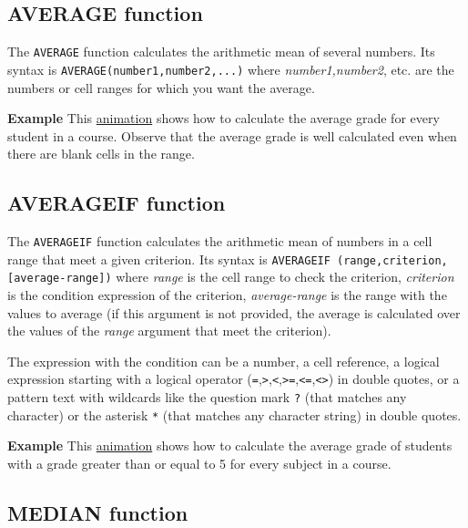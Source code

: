 \subsection{AVERAGE function}\hypertarget{average-function}{}\label{average-function}

The \texttt{AVERAGE} function calculates the arithmetic mean of several numbers. Its syntax is \texttt{AVERAGE(number1,number2,...)} where \emph{number1,number2}, etc. are the numbers or cell ranges for which you want the average.

\textbf{Example} This \href{http://aprendeconalf.es/office/excel/manual/img/example_function_average.gif}{animation} shows how to calculate the average grade for every student in a course. Observe that the average grade is well calculated even when there are blank cells in the range.

\subsection{AVERAGEIF function}\hypertarget{averageif-function}{}\label{averageif-function}

The \texttt{AVERAGEIF} function calculates the arithmetic mean of numbers in a cell range that meet a given criterion. Its syntax is \texttt{AVERAGEIF	(range,criterion,[average-range])} where \emph{range} is the cell range to check the criterion, \emph{criterion} is the condition expression of the criterion, \emph{average-range} is the range with the values to average (if this argument is not provided, the average is calculated over the values of the \emph{range} argument that meet the criterion).

The expression with the condition can be a number, a cell reference, a logical expression starting with a logical
operator
(\texttt{=},\texttt{\textgreater{}},\texttt{\textless{}},\texttt{\textgreater{}=},\texttt{\textless{}=},\texttt{\textless{}\textgreater{}})
in double quotes, or a pattern text with wildcards like the question mark \texttt{?} (that matches any character)
or the asterisk \texttt{*} (that matches any character string) in double quotes.

\textbf{Example} This \href{http://aprendeconalf.es/office/excel/manual/img/example_function_averageif.gif}{animation} shows how to calculate the average grade of students with a grade greater than or equal to 5 for every subject in a course.

\subsection{MEDIAN function}\hypertarget{median-function}{}\label{median-function}

